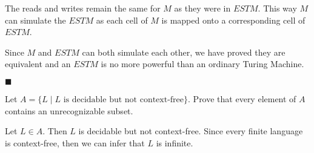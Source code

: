 \documentclass[addpoints,a4paper]{exam}
\begin{document}
\begin{questions}
\begin{solution}
\begin{itemize}
            The reads and writes remain the same for $M$ as they were in $ESTM$. This way $M$ can simulate the $ESTM$ as each cell of $M$ is mapped onto a corresponding cell of $ESTM$. 
    \end{itemize}
    Since $M$ and $ESTM$ can both simulate each other, we have proved they are equivalent and an $ESTM$ is no more powerful than an ordinary Turing Machine. \vspace*{-4mm}
    \begin{flushright}
      $\blacksquare$
    \end{flushright}
  \end{solution}
  
  
  \question [10] Let $A = \{L \mid L\text{ is decidable but not context-free}\}$. Prove that every element of $A$ contains an unrecognizable subset.
  \begin{solution}
    Let $L \in A$. Then $L$ is decidable but not context-free. Since every finite language is context-free, then we can infer that $L$ is infinite. 
    

\end{solution}
\end{questions}
\end{document}
